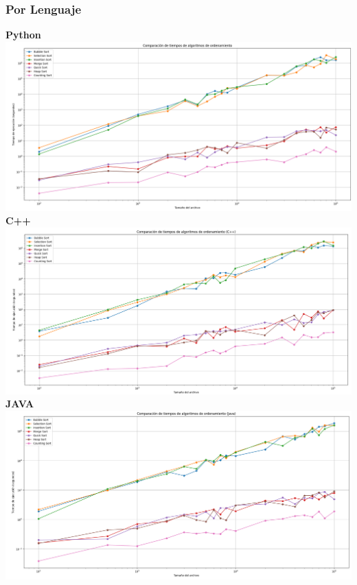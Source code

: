 \subsubsection{Por Lenguaje}
\textbf{Python}
\includegraphics[scale=.25]{img/graficos/por lenguaje/python.png}\\[0.2cm]
\textbf{C++}
\includegraphics[scale=.25]{img/graficos/por lenguaje/c++.png}\\[0.2cm]
\textbf{JAVA}
\includegraphics[scale=.25]{img/graficos/por lenguaje/java.png}\\[0.2cm]

